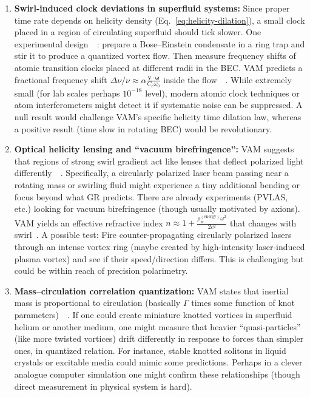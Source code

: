 \documentclass[preprint]{revtex4-2}
\begin{document}
    \begin{enumerate}
        \item \textbf{Swirl-induced clock deviations in superfluid systems:}
        Since proper time rate depends on helicity density (Eq.~\ref{eq:helicity-dilation}), a small clock placed in a region of circulating superfluid should tick slower. One experimental design~\cite{reference_240}~\cite{reference_241}: prepare a Bose–Einstein condensate in a ring trap and stir it to produce a quantized vortex flow. Then measure frequency shifts of atomic transition clocks placed at different radii in the BEC. VAM predicts a fractional frequency shift $\Delta \nu/\nu \approx \alpha \frac{\mathbf{v}\cdot\boldsymbol{\omega}}{C_e \omega_0}$ inside the flow~\cite{reference_242}~\cite{reference_243}. While extremely small (for lab scales perhaps $10^{-18}$ level), modern atomic clock techniques or atom interferometers might detect it if systematic noise can be suppressed. A null result would challenge VAM’s specific helicity time dilation law, whereas a positive result (time slow in rotating BEC) would be revolutionary.

        \item \textbf{Optical helicity lensing and “vacuum birefringence”:}
        VAM suggests that regions of strong swirl gradient act like lenses that deflect polarized light differently~\cite{reference_244}~\cite{reference_245}. Specifically, a circularly polarized laser beam passing near a rotating mass or swirling fluid might experience a tiny additional bending or focus beyond what GR predicts. There are already experiments (PVLAS, etc.) looking for vacuum birefringence (though usually motivated by axions). VAM yields an effective refractive index $n \approx 1 + \frac{\rho_{\text{\ae}}^{(\text{energy})}\omega^2}{2c^2}$ that changes with swirl~\cite{reference_246}. A possible test: Fire counter-propagating circularly polarized lasers through an intense vortex ring (maybe created by high-intensity laser-induced plasma vortex) and see if their speed/direction differs. This is challenging but could be within reach of precision polarimetry.

        \item \textbf{Mass–circulation correlation quantization:}
        VAM states that inertial mass is proportional to circulation (basically $\Gamma$ times some function of knot parameters)~\cite{reference_247}~\cite{reference_248}. If one could create miniature knotted vortices in superfluid helium or another medium, one might measure that heavier “quasi-particles” (like more twisted vortices) drift differently in response to forces than simpler ones, in quantized relation. For instance, stable knotted solitons in liquid crystals or excitable media could mimic some predictions. Perhaps in a clever analogue computer simulation one might confirm these relationships (though direct measurement in physical system is hard).


\end{enumerate}
\end{document}
